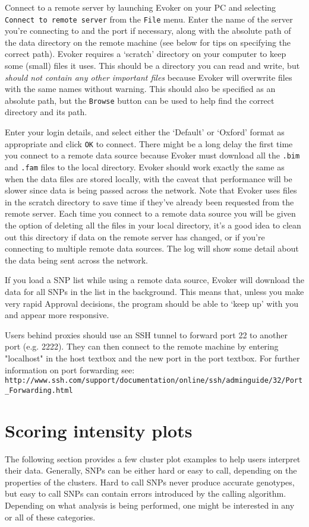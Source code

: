 \documentclass{article}
\begin{document}
Connect to a remote server by launching Evoker on your PC and selecting \texttt{Connect to remote server} from the \texttt{File} menu. Enter the name of the server you're connecting to and the port if necessary, along with the absolute path of the data directory on the remote machine (see below for tips on specifying the correct path). Evoker requires a `scratch' directory on your computer to keep some (small) files it uses. This should be a directory you can read and write, but \emph{should not contain any other important files} because Evoker will overwrite files with the same names without warning. This should also be specified as an absolute path, but the \texttt{Browse} button can be used to help find the correct directory and its path.

Enter your login details, and select either the `Default' or `Oxford' format as appropriate and click \texttt{OK} to connect. There might be a long delay the first time you connect to a remote data source because Evoker must download all the \texttt{.bim} and \texttt{.fam} files to the local directory. Evoker should work exactly the same as when the data files are stored locally, with the caveat that performance will be slower since data is being passed across the network. Note that Evoker uses files in the scratch directory to save time if they've already been requested from the remote server. Each time you connect to a remote data source you will be given the option of deleting all the files in your local directory, it's a good idea to clean out this directory if data on the remote server has changed, or if you're connecting to multiple remote data sources. The log will show some detail about the data being sent across the network.

If you load a SNP list while using a remote data source, Evoker will download the data for all SNPs in the list in the background. This means that, unless you make very rapid Approval decisions, the program should be able to `keep up' with you and appear more responsive.

Users behind proxies should use an SSH tunnel to forward port 22 to another port (e.g. 2222). They can then connect to the remote machine by entering "localhost" in the host textbox and the new port in the port textbox. For further information on port forwarding see:\\\texttt{http://www.ssh.com/support/documentation/online/ssh/adminguide/32/Port\_Forwarding.html}

\section{Scoring intensity plots}
The following section provides a few cluster plot examples to help users interpret their data. Generally, SNPs can be either hard or easy to call, depending on the properties of the clusters. Hard to call SNPs never produce accurate genotypes, but easy to call SNPs can contain errors introduced by the calling algorithm. Depending on what analysis is being performed, one might be interested in any or all of these categories.
\end{document}
